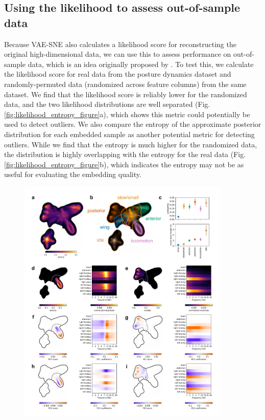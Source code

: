\documentclass[11pt,a4paper,oneside]{book}
\begin{document}
\begin{doublespace}
\subsection{Using the likelihood to assess out-of-sample data}
Because VAE-SNE also calculates a likelihood score for reconstructing the original high-dimensional data, we can use this to assess performance on out-of-sample data, which is an idea originally proposed by \cite{ding2018scvis}. To test this, we calculate the likelihood score for real data from the posture dynamics dataset \citep{berman2014mapping, berman2016predictability, pereira2019fast} and randomly-permuted data (randomized across feature columns) from the same dataset. We find that the likelihood score is reliably lower for the randomized data, and the two likelihood distributions are well separated (Fig. \ref{fig:likelihood_entropy_figure}a), which shows this metric could potentially be used to detect outliers. We also compare the entropy of the approximate posterior distribution for each embedded sample as another potential metric for detecting outliers. While we find that the entropy is much higher for the randomized data, the distribution is highly overlapping with the entropy for the real data (Fig. \ref{fig:likelihood_entropy_figure}b), which indicates the entropy may not be as useful for evaluating the embedding quality.

\begin{figure}[!htb]
\includegraphics[width=0.9\textwidth]{Graving_IMPRS_Thesis/figures/cluster_figure.pdf}
\centering


\end{figure}
\end{doublespace}
\end{document}
